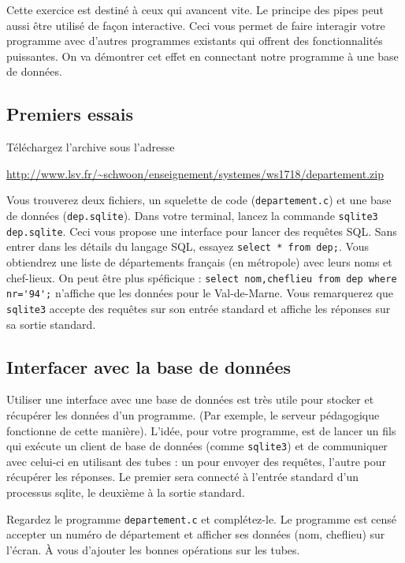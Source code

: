 \documentclass[11pt]{article}
\begin{document}
Cette exercice est destiné à ceux qui avancent vite. Le principe des pipes
peut aussi être utilisé de façon interactive. Ceci vous permet de faire
interagir votre programme avec d'autres programmes existants qui offrent
des fonctionnalités puissantes. On va démontrer cet effet en connectant
notre programme à une base de données.

\subsection{Premiers essais}

Téléchargez l'archive sous l'adresse

\url{http://www.lsv.fr/~schwoon/enseignement/systemes/ws1718/departement.zip}

Vous trouverez deux fichiers, un squelette de code (\texttt{departement.c})
et une base de données (\texttt{dep.sqlite}).
Dans votre terminal, lancez la commande \verb+sqlite3 dep.sqlite+.
Ceci vous propose une interface pour lancer des requêtes SQL. Sans entrer
dans les détails du langage SQL, essayez \verb+select * from dep;+.
Vous obtiendrez une liste de départements français (en métropole) avec 
leurs noms et chef-lieux. On peut être plus spéficique :
\verb+select nom,cheflieu from dep where nr='94';+ n'affiche que les
données pour le Val-de-Marne. Vous remarquerez que \verb+sqlite3+ accepte
des requêtes sur son entrée standard et affiche les réponses sur sa sortie
standard.

\subsection{Interfacer avec la base de données}

Utiliser une interface avec une base de données est très utile pour stocker
et récupérer les données d'un programme. (Par exemple, le serveur
pédagogique fonctionne de cette manière). L'idée, pour votre programme, est de lancer
un fils qui exécute un client de base de données (comme \verb+sqlite3+)
et de communiquer avec celui-ci en utilisant des tubes : un pour envoyer
des requêtes, l'autre pour récupérer les réponses. Le premier sera connecté
à l'entrée standard d'un processus sqlite, le deuxième à la sortie standard.

Regardez le programme \verb+departement.c+ et complétez-le. Le programme
est censé accepter un numéro de département et afficher ses données
(nom, cheflieu) sur l'écran. À vous d'ajouter les bonnes opérations
sur les tubes.
\end{document}
